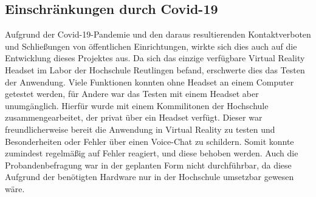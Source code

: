 \subsection{Einschränkungen durch Covid-19}
Aufgrund der Covid-19-Pandemie und den daraus resultierenden Kontaktverboten und Schließungen von öffentlichen Einrichtungen, wirkte sich dies auch auf die Entwicklung dieses Projektes aus. Da sich das einzige verfügbare Virtual Reality Headset im Labor der Hochschule Reutlingen befand, erschwerte dies das Testen der Anwendung. Viele Funktionen konnten ohne Headset an einem Computer getestet werden, für Andere war das Testen mit einem Headset aber unumgänglich. Hierfür wurde mit einem Kommilitonen der Hochschule zusammengearbeitet, der privat über ein Headset verfügt. Dieser war freundlicherweise bereit die Anwendung in Virtual Reality zu testen und Besonderheiten oder Fehler über einen Voice-Chat zu schildern. Somit konnte zumindest regelmäßig auf Fehler reagiert, und diese behoben werden. \newline
Auch die Probandenbefragung war in der geplanten Form nicht durchführbar, da diese Aufgrund der benötigten Hardware nur in der Hochschule umsetzbar gewesen wäre. 
